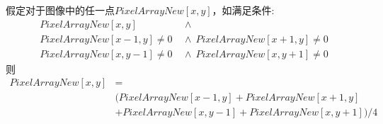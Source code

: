 \documentclass{XDBAthesis}
\begin{document}
假定对于图像中的任一点$PixelArrayNew[x,y]$，如满足条件:
$$
\begin{aligned}
    PixelArrayNew[x,y] \ \ &\wedge\ \  \\
    PixelArrayNew[x-1,y]\neq 0 \ \ &\wedge\ \ PixelArrayNew[x+1,y]\neq 0 \\
    PixelArrayNew[x,y-1]\neq 0\ \ &\wedge\ \ PixelArrayNew[x,y+1]\neq 0
\end{aligned}
$$
则
$$
\begin{aligned}
     PixelArrayNew[x,y]&=\\
    &(PixelArrayNew[x-1,y]+PixelArrayNew[x+1,y]\\
    &+PixelArrayNew[x,y-1]+PixelArrayNew[x,y+1])/4
\end{aligned}  
$$
\ifx\allfiles\undefined
%

\end{document}
